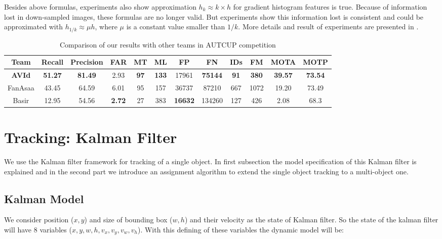 \documentclass[conference]{IEEEtran}
\begin{document}
Besides above formulas, experiments also show approximation $h_{k}\approx k\times h$ for gradient histogram features is true.  Because of information lost in down-sampled images, these formulas are no longer valid. But experiments show this information lost is consistent and could be approximated with $h_{1/k}\approx \mu h$, where $\mu$ is a constant value smaller than $1/k$.
More details and result of experiments are presented in \cite{dollar2014fast}.
\begin{table}[t] \label{tableResult}
	\caption{Comparison of our results with other teams in AUTCUP competition}
	\centering
	\begin{tabular}{c||ccccccccccc}
		\hline
		Team&Recall&Precision&FAR&MT&ML&FP&FN&IDs&FM&MOTA&MOTP\\
		\hline
		\textbf{AVId}&\textbf{51.27}&\textbf{81.49}&2.93&\textbf{97}&\textbf{133}&17961&\textbf{75144}&\textbf{91}&\textbf{380}&\textbf{39.57}&\textbf{73.54}\\
		FanAsaa&43.45&64.59&6.01&95&157&36737&87210&667&1072&19.20&73.49\\
		Basir&12.95&54.56&\textbf{2.72}&27&383&\textbf{16632}&134260&127&426&2.08&68.3\\
		\hline
	\end{tabular}
	
\end{table}


\section{Tracking: Kalman Filter}
We use the Kalman filter framework for tracking of a single object. In first subsection the model specification of this Kalman filter is explained and in the second part we introduce  an assignment algorithm  to extend the single object tracking to a multi-object one.
\subsection{Kalman Model}
We consider position ($x,y$) and size of bounding box ($w,h$) and their velocity as the state of Kalman filter. So the state of the kalman filter will have 8 variables ($x,y,w,h,v_x,v_y,v_w,v_h$).
With this defining of these variables the dynamic model will be:
\end{document}
